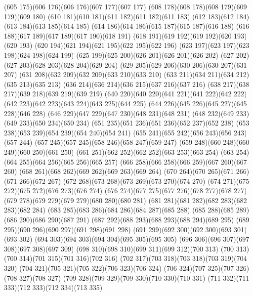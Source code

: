 \cpath (605 175)(606 176)(606 176)(607 177)(607 177)
\cpath (608 178)(608 178)(608 179)(609 179)(609 180)
\cpath (610 181)(610 181)(611 182)(611 182)(611 183)
\cpath (612 183)(612 184)(613 184)(613 185)(614 185)
\cpath (614 186)(614 186)(615 187)(615 187)(616 188)
\cpath (616 188)(617 189)(617 189)(617 190)(618 191)
\cpath (618 191)(619 192)(619 192)(620 193)(620 193)
\cpath (620 194)(621 194)(621 195)(622 195)(622 196)
\cpath (623 197)(623 197)(623 198)(624 198)(624 199)
\cpath (625 199)(625 200)(626 201)(626 201)(626 202)
\cpath (627 202)(627 203)(628 203)(628 204)(629 204)
\cpath (629 205)(629 206)(630 206)(630 207)(631 207)
\cpath (631 208)(632 209)(632 209)(633 210)(633 210)
\cpath (633 211)(634 211)(634 212)(635 213)(635 213)
\cpath (636 214)(636 214)(636 215)(637 216)(637 216)
\cpath (638 217)(638 217)(639 218)(639 219)(639 219)
\cpath (640 220)(640 220)(641 221)(641 222)(642 222)
\cpath (642 223)(642 223)(643 224)(643 225)(644 225)
\cpath (644 226)(645 226)(645 227)(645 228)(646 228)
\cpath (646 229)(647 229)(647 230)(648 231)(648 231)
\cpath (648 232)(649 233)(649 233)(650 234)(650 234)
\cpath (651 235)(651 236)(651 236)(652 237)(652 238)
\cpath (653 238)(653 239)(654 239)(654 240)(654 241)
\cpath (655 241)(655 242)(656 243)(656 243)(657 244)
\cpath (657 245)(657 245)(658 246)(658 247)(659 247)
\cpath (659 248)(660 248)(660 249)(660 250)(661 250)
\cpath (661 251)(662 252)(662 252)(663 253)(663 254)
\cpath (663 254)(664 255)(664 256)(665 256)(665 257)
\cpath (666 258)(666 258)(666 259)(667 260)(667 260)
\cpath (668 261)(668 262)(669 262)(669 263)(669 264)
\cpath (670 264)(670 265)(671 266)(671 266)(672 267)
\cpath (672 268)(673 268)(673 269)(673 270)(674 270)
\cpath (674 271)(675 272)(675 272)(676 273)(676 274)
\cpath (676 274)(677 275)(677 276)(678 277)(678 277)
\cpath (679 278)(679 279)(679 279)(680 280)(680 281)
\cpath (681 281)(681 282)(682 283)(682 283)(682 284)
\cpath (683 285)(683 286)(684 286)(684 287)(685 288)
\cpath (685 288)(685 289)(686 290)(686 290)(687 291)
\cpath (687 292)(688 293)(688 293)(688 294)(689 295)
\cpath (689 295)(690 296)(690 297)(691 298)(691 298)
\cpath (691 299)(692 300)(692 300)(693 301)(693 302)
\cpath (694 303)(694 303)(694 304)(695 305)(695 305)
\cpath (696 306)(696 307)(697 308)(697 308)(697 309)
\cpath (698 310)(698 310)(699 311)(699 312)(700 313)
\cpath (700 313)(700 314)(701 315)(701 316)(702 316)
\cpath (702 317)(703 318)(703 318)(703 319)(704 320)
\cpath (704 321)(705 321)(705 322)(706 323)(706 324)
\cpath (706 324)(707 325)(707 326)(708 327)(708 327)
\cpath (709 328)(709 329)(709 330)(710 330)(710 331)
\cpath (711 332)(711 333)(712 333)(712 334)(713 335)
